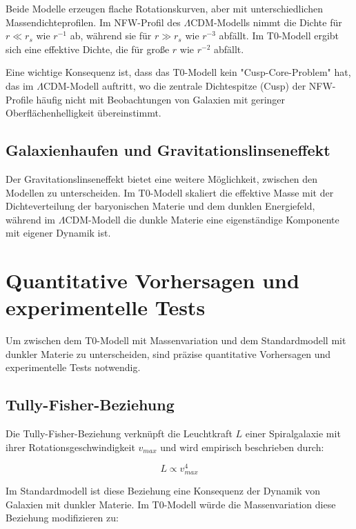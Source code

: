 \documentclass[a4paper,12pt]{article}
\begin{document}
	Beide Modelle erzeugen flache Rotationskurven, aber mit unterschiedlichen Massendichteprofilen. Im NFW-Profil des $\Lambda$CDM-Modells nimmt die Dichte für $r \ll r_s$ wie $r^{-1}$ ab, während sie für $r \gg r_s$ wie $r^{-3}$ abfällt. Im T0-Modell ergibt sich eine effektive Dichte, die für große $r$ wie $r^{-2}$ abfällt.
	
	Eine wichtige Konsequenz ist, dass das T0-Modell kein "Cusp-Core-Problem" hat, das im $\Lambda$CDM-Modell auftritt, wo die zentrale Dichtespitze (Cusp) der NFW-Profile häufig nicht mit Beobachtungen von Galaxien mit geringer Oberflächenhelligkeit übereinstimmt.
	
	\subsection{Galaxienhaufen und Gravitationslinseneffekt}
	
	Der Gravitationslinseneffekt bietet eine weitere Möglichkeit, zwischen den Modellen zu unterscheiden. Im T0-Modell skaliert die effektive Masse mit der Dichteverteilung der baryonischen Materie und dem dunklen Energiefeld, während im $\Lambda$CDM-Modell die dunkle Materie eine eigenständige Komponente mit eigener Dynamik ist.
	
	\section{Quantitative Vorhersagen und experimentelle Tests}
	
	Um zwischen dem T0-Modell mit Massenvariation und dem Standardmodell mit dunkler Materie zu unterscheiden, sind präzise quantitative Vorhersagen und experimentelle Tests notwendig.
	
	\subsection{Tully-Fisher-Beziehung}
	
	Die Tully-Fisher-Beziehung verknüpft die Leuchtkraft $L$ einer Spiralgalaxie mit ihrer Rotationsgeschwindigkeit $v_{max}$ und wird empirisch beschrieben durch:
	
	\begin{equation}
		L \propto v_{max}^{4}
	\end{equation}
	
	Im Standardmodell ist diese Beziehung eine Konsequenz der Dynamik von Galaxien mit dunkler Materie. Im T0-Modell würde die Massenvariation diese Beziehung modifizieren zu:
	
\end{document}
